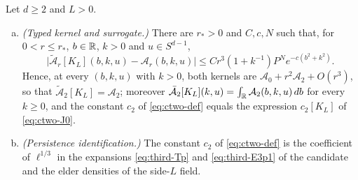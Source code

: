 \begin{corollary}[identification of $c_2$]\label{hyp:ctwo-ident}
Let $d\ge2$ and $L>0$.
\begin{enumerate}[(a),leftmargin=2em]
\item \emph{(Typed kernel and surrogate.)} There are $r_*>0$ and $C,c,N$ such that, for $0<r\le r_*$, $b\in\mathbb R$, $k>0$ and $u\in S^{d-1}$,
\[
\bigl|\widetilde{\mathcal A}_r[K_L](b,k,u)-\mathcal A_r(b,k,u)\bigr|\le Cr^3(1+k^{-1})P^Ne^{-c(b^2+k^2)} .
\]
Hence, at every $(b,k,u)$ with $k>0$, both kernels are $\mathcal A_0+r^2\mathcal A_2+O(r^3)$, so that $\widetilde{\mathcal A}_2[K_L]=\mathcal A_2$; moreover $\bar{\mathcal A}_2[K_L](k,u)=\int_\mathbb R\mathcal A_2(b,k,u)\,db$ for every $k\ge0$, and the constant $c_2$ of \eqref{eq:ctwo-def} equals the expression $c_2[K_L]$ of \eqref{eq:ctwo-J0}.
\item \emph{(Persistence identification.)} The constant $c_2$ of \eqref{eq:ctwo-def} is the coefficient of $\ell^{1/3}$ in the expansions \eqref{eq:third-Tp} and \eqref{eq:third-E3p1} of the candidate and the elder densities of the side-$L$ field.
\end{enumerate}
\end{corollary}

